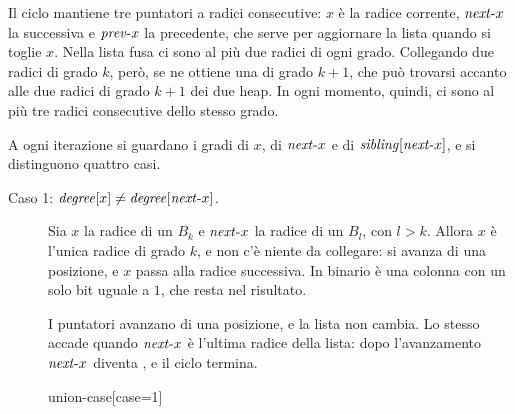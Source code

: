 Il ciclo mantiene tre puntatori a radici consecutive: $x$ è la radice corrente, $\mathit{next}\text{-}x$ la successiva e $\mathit{prev}\text{-}x$ la precedente, che serve per aggiornare la lista quando si toglie $x$. Nella lista fusa ci sono al più due radici di ogni grado. Collegando due radici di grado $k$, però, se ne ottiene una di grado $k+1$, che può trovarsi accanto alle due radici di grado $k+1$ dei due heap. In ogni momento, quindi, ci sono al più tre radici consecutive dello stesso grado.

A ogni iterazione si guardano i gradi di $x$, di $\mathit{next}\text{-}x$ e di $\mathit{sibling}[\mathit{next}\text{-}x]$, e si distinguono quattro casi.

\begin{description}
  \item[{Caso 1: $\mathit{degree}[x] \ne \mathit{degree}[\mathit{next}\text{-}x]$.}] Sia $x$ la radice di un $B_k$ e $\mathit{next}\text{-}x$ la radice di un $B_l$, con $l > k$. Allora $x$ è l'unica radice di grado $k$, e non c'è niente da collegare: si avanza di una posizione, e $x$ passa alla radice successiva. In binario è una colonna con un solo bit uguale a $1$, che resta nel risultato.

  \begin{casofig}[1]
  I puntatori avanzano di una posizione, e la lista non cambia. Lo stesso accade quando $\mathit{next}\text{-}x$ è l'ultima radice della lista: dopo l'avanzamento $\mathit{next}\text{-}x$ diventa \Nil{}, e il ciclo termina.
  \tcblower
  \begin{widget}{union-case}[case=1]
  \end{widget}
  \end{casofig}


\end{description}
